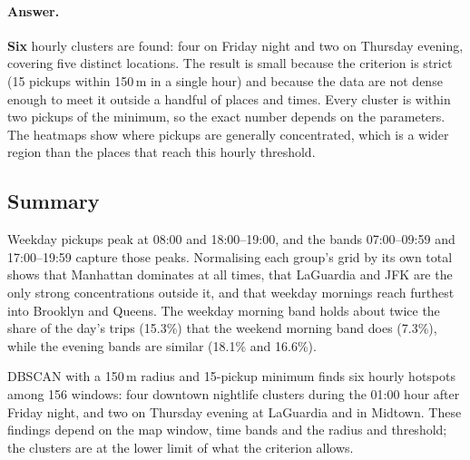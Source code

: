 \documentclass[11pt,a4paper]{article}
\begin{document}
\paragraph{Answer.} \textbf{Six} hourly clusters are found: four on Friday night and two on Thursday evening, covering five distinct locations. The result is small because the criterion is strict (15 pickups within 150\,m in a single hour) and because the data are not dense enough to meet it outside a handful of places and times. Every cluster is within two pickups of the minimum, so the exact number depends on the parameters. The heatmaps show where pickups are generally concentrated, which is a wider region than the places that reach this hourly threshold.

\subsection{Summary}

Weekday pickups peak at 08:00 and 18:00--19:00, and the bands 07:00--09:59 and 17:00--19:59 capture those peaks. Normalising each group's grid by its own total shows that Manhattan dominates at all times, that LaGuardia and JFK are the only strong concentrations outside it, and that weekday mornings reach furthest into Brooklyn and Queens. The weekday morning band holds about twice the share of the day's trips (15.3\%) that the weekend morning band does (7.3\%), while the evening bands are similar (18.1\% and 16.6\%).

DBSCAN with a 150\,m radius and 15-pickup minimum finds six hourly hotspots among 156 windows: four downtown nightlife clusters during the 01:00 hour after Friday night, and two on Thursday evening at LaGuardia and in Midtown. These findings depend on the map window, time bands and the radius and threshold; the clusters are at the lower limit of what the criterion allows.
\end{document}
